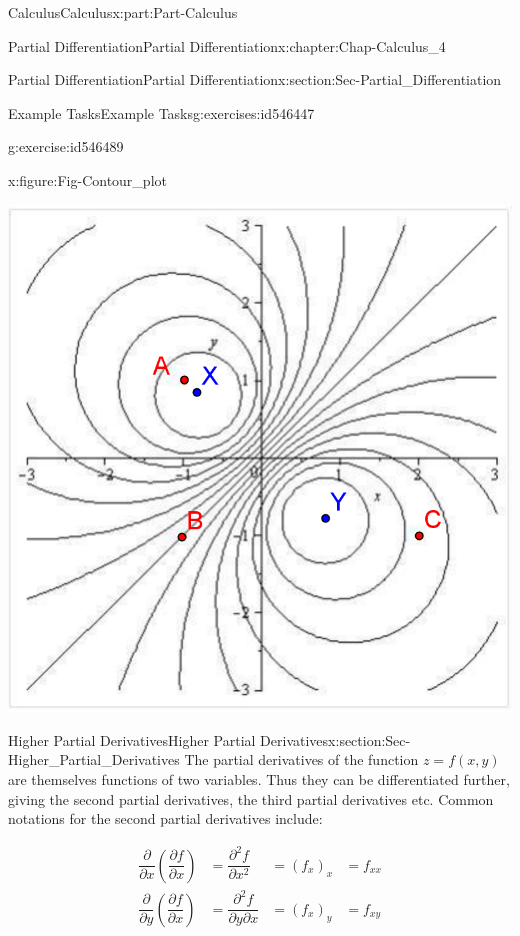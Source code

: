 \documentclass[oneside,10pt,]{book}
\numberwithin{equation}{section}
\newcommand{\amp}{&}
\begin{document}
\begin{partptx}{Calculus}{}{Calculus}{}{}{x:part:Part-Calculus}
\begin{chapterptx}{Partial Differentiation}{}{Partial Differentiation}{}{}{x:chapter:Chap-Calculus_4}
\begin{sectionptx}{Partial Differentiation}{}{Partial Differentiation}{}{}{x:section:Sec-Partial_Differentiation}
\begin{exercises-subsection-numberless}{Example Tasks}{}{Example Tasks}{}{}{g:exercises:id546447}
\begin{divisionexercise}{5}{}{}{g:exercise:id546489}
\begin{figureptx}{}{x:figure:Fig-Contour_plot}{}
\begin{image}{0.15}{0.7}{0.15}
\includegraphics[width=\linewidth]{./Calculus/Images/4/Contour_plot.png}
\end{image}%
\tcblower
\end{figureptx}%
\end{divisionexercise}%
\end{exercises-subsection-numberless}
\end{sectionptx}
%
%
\typeout{************************************************}
\typeout{************************************************}
%
\begin{sectionptx}{Higher Partial Derivatives}{}{Higher Partial Derivatives}{}{}{x:section:Sec-Higher_Partial_Derivatives}
The partial derivatives of the function \(z=f(x,y)\) are themselves functions of two variables. Thus they can be differentiated further, giving the second partial derivatives, the third partial derivatives etc. Common notations for the second partial derivatives include:%
\par
%
\begin{alignat*}{2}
\dfrac{\partial}{\partial x} \left( \dfrac{\partial f}{\partial x} \right) \amp = \dfrac{\partial^2 f}{\partial x^2} \amp = (f_x)_x \amp = f_{xx}\\
\dfrac{\partial}{\partial y} \left( \dfrac{\partial f}{\partial x} \right) \amp = \dfrac{\partial^2 f}{\partial y \partial x} \amp = (f_x)_y \amp = f_{xy}\\

\end{alignat*}
\end{sectionptx}
\end{chapterptx}
\end{partptx}
\end{document}
